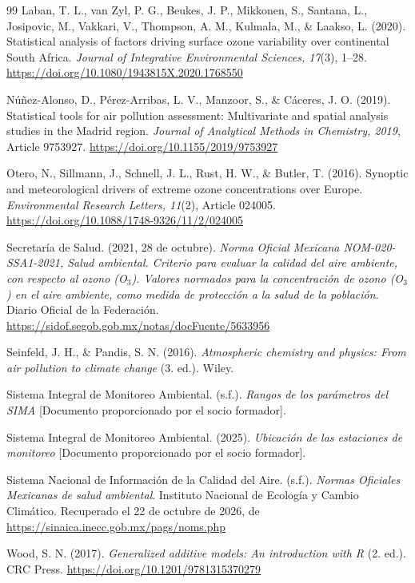 \documentclass[11pt,letterpaper]{article}
\begin{document}
\begin{thebibliography}{99}
Laban, T. L., van Zyl, P. G., Beukes, J. P., Mikkonen, S., Santana, L., Josipovic, M., Vakkari, V., Thompson, A. M., Kulmala, M., \& Laakso, L. (2020). Statistical analysis of factors driving surface ozone variability over continental South Africa. \textit{Journal of Integrative Environmental Sciences, 17}(3), 1--28. \url{https://doi.org/10.1080/1943815X.2020.1768550}

Núñez-Alonso, D., Pérez-Arribas, L. V., Manzoor, S., \& Cáceres, J. O. (2019). Statistical tools for air pollution assessment: Multivariate and spatial analysis studies in the Madrid region. \textit{Journal of Analytical Methods in Chemistry, 2019}, Article 9753927. \url{https://doi.org/10.1155/2019/9753927}

Otero, N., Sillmann, J., Schnell, J. L., Rust, H. W., \& Butler, T. (2016). Synoptic and meteorological drivers of extreme ozone concentrations over Europe. \textit{Environmental Research Letters, 11}(2), Article 024005. \url{https://doi.org/10.1088/1748-9326/11/2/024005}

Secretaría de Salud. (2021, 28 de octubre). \textit{Norma Oficial Mexicana NOM-020-SSA1-2021, Salud ambiental. Criterio para evaluar la calidad del aire ambiente, con respecto al ozono (O$_3$). Valores normados para la concentración de ozono (O$_3$) en el aire ambiente, como medida de protección a la salud de la población}. Diario Oficial de la Federación. \url{https://sidof.segob.gob.mx/notas/docFuente/5633956}

Seinfeld, J. H., \& Pandis, S. N. (2016). \textit{Atmospheric chemistry and physics: From air pollution to climate change} (3.\textordfeminine{} ed.). Wiley.

Sistema Integral de Monitoreo Ambiental. (s.f.). \textit{Rangos de los parámetros del SIMA} [Documento proporcionado por el socio formador].

Sistema Integral de Monitoreo Ambiental. (2025). \textit{Ubicación de las estaciones de monitoreo} [Documento proporcionado por el socio formador].

Sistema Nacional de Información de la Calidad del Aire. (s.f.). \textit{Normas Oficiales Mexicanas de salud ambiental}. Instituto Nacional de Ecología y Cambio Climático. Recuperado el 22 de octubre de 2026, de \url{https://sinaica.inecc.gob.mx/pags/noms.php}

Wood, S. N. (2017). \textit{Generalized additive models: An introduction with R} (2.\textordfeminine{} ed.). CRC Press. \url{https://doi.org/10.1201/9781315370279}

\end{thebibliography}
\clearpage
\end{document}
